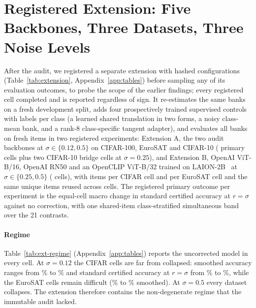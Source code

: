 \section{Registered Extension: Five Backbones, Three Datasets, Three Noise Levels}
\label{sec:extension}

After the audit, we registered a separate extension with hashed
configurations (Table~\ref{tab:extension}, Appendix~\ref{app:tables}) before
sampling any of its evaluation outcomes, to probe the scope of the earlier
findings; every registered cell completed and is reported regardless of sign.
It re-estimates the same
\ExpCandidates{} banks on a fresh development split, adds four prospectively
trained supervised controls with \FarlaShots{} labels per class (a learned
shared translation in two forms, a noisy class-mean bank, and a
rank-8 class-specific tangent adapter), and evaluates all \ExtBanks{} banks on
fresh items in two registered experiments: Extension A, the two audit backbones at $\sigma\in\{0.12,0.5\}$ on CIFAR-100,
EuroSAT and CIFAR-10 (\ExtPrimaryCellsA{} primary cells plus two CIFAR-10
bridge cells at $\sigma=0.25$), and Extension B, OpenAI ViT-B/16, OpenAI RN50 and an
OpenCLIP ViT-B/32 trained on LAION-2B~\cite{schuhmann2022laion5b,cherti2023openclip} at
$\sigma\in\{0.25,0.5\}$ (\ExtCellsB{} cells), with \ExtItemsCifar{} items per
CIFAR cell and \ExtItemsEurosat{} per EuroSAT cell and the same
\ExtUniqueItems{} unique items reused across cells. The registered primary
outcome per experiment is the equal-cell macro change in standard certified
accuracy at $r=\sigma$ against no correction, with one shared-item
class-stratified simultaneous band over the 21 contrasts.

\paragraph{Regime}
Table~\ref{tab:ext-regime} (Appendix~\ref{app:tables}) reports the uncorrected
model in every cell. At
$\sigma=0.12$ the CIFAR cells are far from collapsed: smoothed accuracy ranges
from \ExtSmoothedTwelveCifarLo\% to \ExtSmoothedTwelveCifarHi\% and standard
certified accuracy at $r=\sigma$ from \ExtStdCATwelveCifarLo\% to
\ExtStdCATwelveCifarHi\%, while the EuroSAT cells remain difficult
(\ExtSmoothedTwelveEurosatLo\% to \ExtSmoothedTwelveEurosatHi\% smoothed).
At $\sigma=0.5$ every dataset collapses. The extension therefore contains the
non-degenerate regime that the immutable audit lacked.

